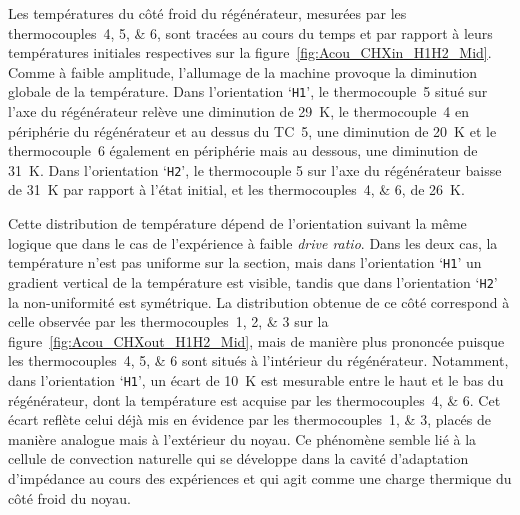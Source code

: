 Les températures du côté froid du régénérateur, mesurées par les thermocouples~\numlist{4;5;6}, sont tracées au cours du temps et par rapport à leurs températures initiales respectives sur la figure~\ref{fig:Acou_CHXin_H1H2_Mid}. Comme à faible amplitude, l'allumage de la machine provoque la diminution globale de la température. Dans l'orientation `\texttt{H1}', le thermocouple~\num{5} situé sur l'axe du régénérateur relève une diminution de \qty{29}{\kelvin},  le thermocouple~\num{4} en périphérie du régénérateur et au dessus du TC~\num{5}, une diminution de \qty{20}{\kelvin} et le thermocouple~\num{6} également en périphérie mais au dessous, une diminution de \qty{31}{\kelvin}. Dans l'orientation `\texttt{H2}', le thermocouple \num{5} sur l'axe du régénérateur baisse de \qty{31}{\kelvin} par rapport à l'état initial, et les thermocouples~\numlist{4;6}, de \qty{26}{\kelvin}. %

Cette distribution de température dépend de l'orientation suivant la même logique que dans le cas de l'expérience à faible \textit{drive ratio}. Dans les deux cas, la température n'est pas uniforme sur la section, mais dans l'orientation `\texttt{H1}' un gradient vertical de la température est visible, tandis que dans l'orientation `\texttt{H2}' la non-uniformité est symétrique. La distribution obtenue de ce côté correspond à celle observée par les thermocouples~\numlist{1;2;3} sur la figure~\ref{fig:Acou_CHXout_H1H2_Mid}, mais de manière plus prononcée puisque les thermocouples~\numlist{4;5;6} sont situés à l'intérieur du régénérateur. Notamment, dans l'orientation `\texttt{H1}', un écart de \qty{10}{\kelvin} est mesurable entre le haut et le bas du régénérateur, dont la température est acquise par les thermocouples~\numlist{4;6}. Cet écart reflète celui déjà mis en évidence par les thermocouples~\numlist{1;3}, placés de manière analogue mais à l'extérieur du noyau. Ce phénomène semble lié à la cellule de convection naturelle qui se développe dans la cavité d'adaptation d'impédance au cours des expériences et qui agit comme une charge thermique du côté froid du noyau.\medskip

